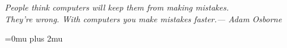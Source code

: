 \documentclass[12pt, hidelinks]{report}
\begin{document}

\frontespizio

\newpage
{}
\begin{flushright}
\null{}
\emph{People think computers will keep them from making mistakes.\\They're wrong. With computers you make mistakes faster.\break --- Adam Osborne}
\null
\end{flushright}    
\newpage

\beforepreface
\afterpreface










\Urlmuskip=0mu plus 2mu\relax
\cleardoublepage
{}
{}



\end{document}
